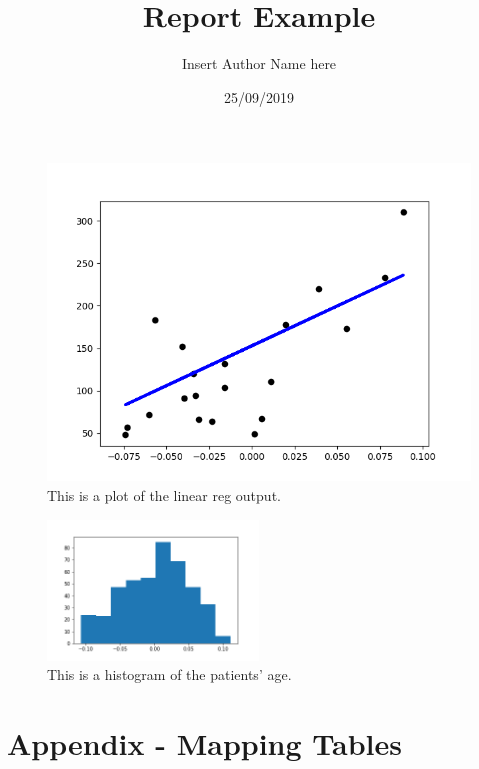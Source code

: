 \documentclass{article}%
\title{Report Example}%
\author{Insert Author Name here}%
\date{25/09/2019}%
\begin{document}
%
\normalsize%
\maketitle%
%
%
%
%


\begin{figure}[ht]%
\centering%
\includegraphics[scale=0.6]{../figures/Figure1.png}%
\linebreak%
\caption{This is a plot of the linear reg output.}%
\end{figure}

%


\begin{figure}[ht]%
\centering%
\includegraphics[width=0.5\textwidth]{../figures/Figure2.png}%
\linebreak%
\caption{This is a histogram of the patients' age.}%
\end{figure}

%
%
%
%
\clearpage%
\section{Appendix {-} Mapping Tables}%
\label{sec:Appendix {-} Mapping Tables}%
\end{document}
